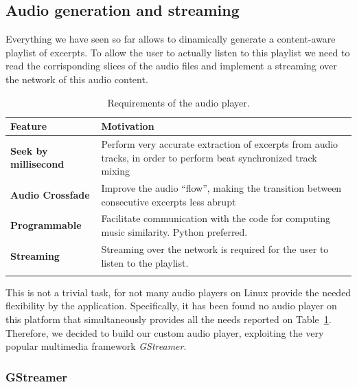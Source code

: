 \subsection{Audio generation and streaming}
\label{sec:audio}
Everything we have seen so far allows to dinamically generate a content-aware playlist of excerpts. To allow the user to actually listen to this playlist we need to read the corrisponding slices of the audio files and implement a streaming over the network of this audio content. \\ 
\begin{center}
\begin{longtable}{ p{}  p{} } 
\textbf{Feature} & \textbf{Motivation} \\
\toprule
\textbf{Seek by millisecond}   & Perform very accurate extraction of excerpts from audio tracks, in order to perform beat synchronized track mixing \\ \midrule
\textbf{Audio Crossfade}   & Improve the audio ``flow'', making the transition between consecutive excerpts less abrupt \\ \midrule
\textbf{Programmable} & Facilitate communication with the code for computing music similarity. Python preferred.  \\ \midrule
\textbf{Streaming} & Streaming over the network is required for the user to listen to the playlist.  \\ \bottomrule
\caption[Requirements of the audio player]{Requirements of the audio player.}
\label{table:playerfeatures}
\end{longtable}
\end{center}
This is not a trivial task, for not many audio players on Linux provide the needed flexibility by the application. Specifically, it has been found no audio player on this platform that simultaneously provides all the needs reported on Table~\ref{table:playerfeatures}. Therefore, we decided to build our custom audio player, exploiting the very popular multimedia framework \textit{GStreamer}.



\subsubsection*{GStreamer}
\label{subsec:gstreamer}

